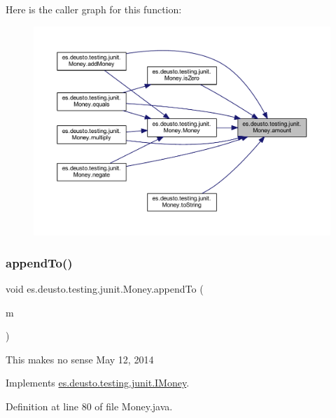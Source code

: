 Here is the caller graph for this function\+:
\nopagebreak
\begin{figure}[H]
\begin{center}
\leavevmode
\includegraphics[width=350pt]{classes_1_1deusto_1_1testing_1_1junit_1_1_money_a9bef5d9027f270e8ce0303e4f929bbd5_icgraph}
\end{center}
\end{figure}
\mbox{\label{classes_1_1deusto_1_1testing_1_1junit_1_1_money_aa9a6df9f35118060914ae6e8f74d1d51}} 
\subsubsection{\texorpdfstring{appendTo()}{appendTo()}}
{\footnotesize\ttfamily void es.\+deusto.\+testing.\+junit.\+Money.\+append\+To (\begin{DoxyParamCaption}\item[{\mbox{\hyperlink{classes_1_1deusto_1_1testing_1_1junit_1_1_money_bag}{Money\+Bag}}}]{m }\end{DoxyParamCaption})}

This makes no sense May 12, 2014 

Implements \mbox{\hyperlink{interfacees_1_1deusto_1_1testing_1_1junit_1_1_i_money_ae45bc758e69a0017f083f11d050c53cb}{es.\+deusto.\+testing.\+junit.\+I\+Money}}.



Definition at line 80 of file Money.\+java.

